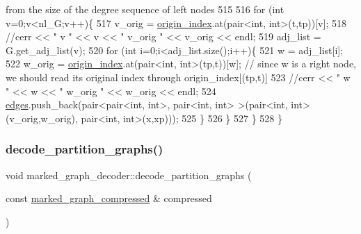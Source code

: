 \begin{DoxyCode}
{       from the size of the degree sequence of left nodes}
515     
516     \textcolor{keywordflow}{for} (\textcolor{keywordtype}{int} v=0;v<nl\_G;v++)\{
517       v\_orig = \hyperlink{classmarked__graph__decoder_aab3e2f6d4376ba96da32f25aa9ddd069}{origin\_index}.at(pair<int, int>(t,tp))[v];
518       \textcolor{comment}{//cerr << " v " << v << " v\_orig " << v\_orig << endl;}
519       adj\_list = G.get\_adj\_list(v);
520       \textcolor{keywordflow}{for} (\textcolor{keywordtype}{int} i=0;i<adj\_list.size();i++)\{
521         w = adj\_list[i];
522         w\_orig = \hyperlink{classmarked__graph__decoder_aab3e2f6d4376ba96da32f25aa9ddd069}{origin\_index}.at(pair<int, int>(tp,t))[w]; \textcolor{comment}{// since w is a right node, we
       should read its original index through origin\_index[(tp,t)]}
523         \textcolor{comment}{//cerr << " w " << w << " w\_orig " << w\_orig << endl;}
524         \hyperlink{classmarked__graph__decoder_af9e75da0a495d9c3bdcd169e15e3261e}{edges}.push\_back(pair<pair<int, int>, pair<int, int> >(pair<int, int>(v\_orig,w\_orig), pair<int,
       int>(x,xp)));
525       \}
526     \}
527   \}
528 \}
\end{DoxyCode}
\mbox{\label{classmarked__graph__decoder_a80eb5f68b45ba160b9a00334476b6be7}} 
\subsubsection{\texorpdfstring{decode\+\_\+partition\+\_\+graphs()}{decode\_partition\_graphs()}}
{\footnotesize\ttfamily void marked\+\_\+graph\+\_\+decoder\+::decode\+\_\+partition\+\_\+graphs (\begin{DoxyParamCaption}\item[{const \hyperlink{classmarked__graph__compressed}{marked\+\_\+graph\+\_\+compressed} \&}]{compressed }\end{DoxyParamCaption})\hspace{0.3cm}{\ttfamily [private]}}


